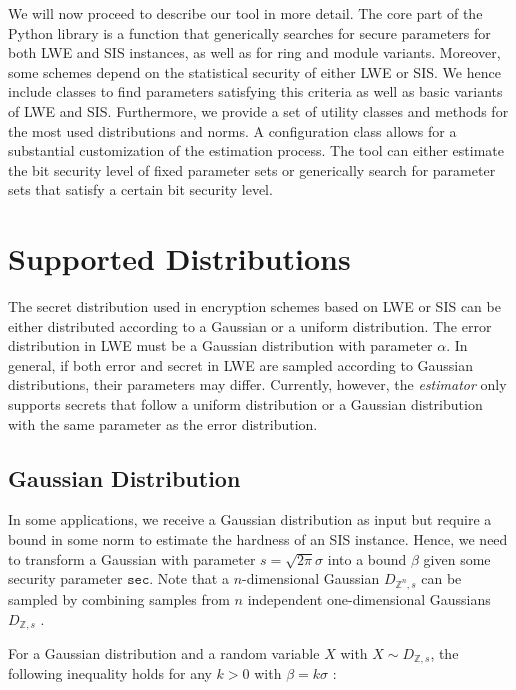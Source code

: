 We will now proceed to describe our tool in more detail. The core part of the Python library is a function that generically searches for secure parameters for both LWE and SIS instances, as well as for ring and module variants. Moreover, some schemes depend on the statistical security of either LWE or SIS. We hence include classes to find parameters satisfying this criteria as well as basic variants of LWE and SIS. %
Furthermore, we provide a set of utility classes and methods for the most used distributions and norms.
A configuration class allows for a substantial customization of the estimation process.
The tool can either estimate the bit security level of fixed parameter sets or generically search for parameter sets that satisfy a certain bit security level.

\section{Supported Distributions} \label{sec:supported-distributions}%
The secret distribution used in encryption schemes based on LWE or SIS can be either distributed according to a Gaussian or a uniform distribution. The error distribution in LWE must be a Gaussian distribution with parameter $\alpha$. In general, if both error and secret in LWE are sampled according to Gaussian distributions, their parameters may differ. Currently, however, the \textit{estimator} only supports secrets that follow a uniform distribution or a Gaussian distribution with the same parameter as the error distribution.

\subsection{Gaussian Distribution}
In some applications, we receive a Gaussian distribution as input but require a bound in some norm to estimate the hardness of an SIS instance. Hence, we need to transform a Gaussian with parameter $s  = \sqrt{2 \pi} \sigma$ into a bound $\beta$ given some security parameter $\texttt{sec}$. Note that a $n$-dimensional Gaussian $D_{\mathbb{Z}^n, s}$ can be sampled by combining samples from $n$ independent one-dimensional Gaussians $D_{\mathbb{Z}, s}$ \cite{GJS15}. %

For a Gaussian distribution and a random variable $X$ with $X \sim D_{\mathbb{Z}, s}$, the following inequality holds for any $k>0$ with $\beta = k\sigma$ \cite[Lemma~4.4]{Lyu12}: %


